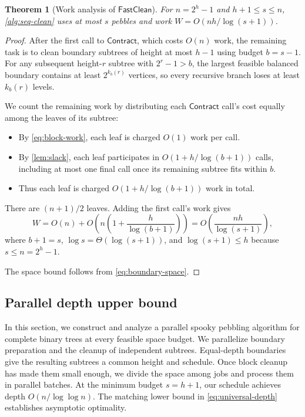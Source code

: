 \documentclass[11pt]{article}
\newtheorem{theorem}{Theorem}[section]
\theoremstyle{definition}
\theoremstyle{remark}
\newcommand{\Clean}{\mathsf{FastClean}}
\newcommand{\Contract}{\mathsf{Contract}}
\begin{document}
\begin{theorem}[Work analysis of $\Clean$]
\label{thm:seq-upper}
For $n=2^h-1$ and $h+1\le s\le n$, \cref{alg:seq-clean} uses at most $s$ pebbles and work $W=O(nh/\log(s+1))$.
\end{theorem}
\begin{proof}

After the first call to $\Contract$, which costs $O(n)$ work, the remaining task is to clean boundary subtrees of height at most $h-1$ using budget $b=s-1$. For any subsequent height-$r$ subtree with $2^r-1>b$, the largest feasible balanced boundary contains at least $2^{k_b(r)}$ vertices, so every recursive branch loses at least $k_b(r)$ levels.

We count the remaining work by distributing each $\Contract$ call's cost equally among the leaves of its subtree:
\begin{itemize}
    \item By \cref{eq:block-work}, each leaf is charged $O(1)$ work per call.
    \item By \cref{lem:slack}, each leaf participates in $O(1+h/\log(b+1))$ calls, including at most one final call once its remaining subtree fits within $b$.
    \item Thus each leaf is charged $O(1+h/\log(b+1))$ work in total.
\end{itemize}
There are $(n+1)/2$ leaves. Adding the first call's work gives
\[
W=O(n)+O\!\left(n\left(1+\frac{h}{\log(b+1)}\right)\right)
 =O\!\left(\frac{nh}{\log(s+1)}\right),
\]
where $b+1=s$, $\log s=\Theta(\log(s+1))$, and $\log(s+1)\le h$ because $s\le n=2^h-1$.

The space bound follows from \cref{eq:boundary-space}.

\end{proof}

\subsection{Parallel depth upper bound}
\label{sec:parallel-upper}

In this section, we construct and analyze a parallel spooky pebbling algorithm for complete binary trees at every feasible space budget. We parallelize boundary preparation and the cleanup of independent subtrees. Equal-depth boundaries give the resulting subtrees a common height and schedule. Once block cleanup has made them small enough, we divide the space among jobs and process them in parallel batches.
At the minimum budget $s=h+1$, our schedule achieves depth $O(n/\log\log n)$. The matching lower bound in \cref{eq:universal-depth} establishes asymptotic optimality.
\end{document}
